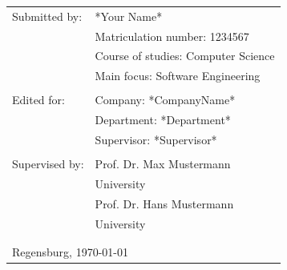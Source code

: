 \hskip 2.0cm
\begin{small}
\begin{tabular}{ll}
Submitted by:\hspace{0.7cm} & *Your Name*\tabularnewline
 & Matriculation number: 1234567\tabularnewline
 & Course of studies: Computer Science\tabularnewline
 & Main focus: Software Engineering \tabularnewline
 & \tabularnewline
 
 Edited for:\hspace{1cm} & Company: *CompanyName*\tabularnewline
 & Department: *Department* \tabularnewline
 & Supervisor: *Supervisor* \tabularnewline
 & \tabularnewline
 
Supervised by: & Prof. Dr. Max Mustermann\tabularnewline
 & University\tabularnewline
 & Prof. Dr. Hans Mustermann\tabularnewline
 & University\tabularnewline
 & \tabularnewline
  & \tabularnewline
\multicolumn{2}{l}{Regensburg, \today}\tabularnewline
\end{tabular}
\end{small}
